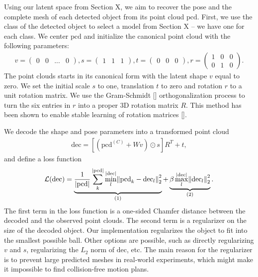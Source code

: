 \documentclass{article}
\newcommand{\pcx}[1]{\mathrm{pcd}^{(#1)}}
\newcommand{\pcc}{\pcx{C}}
\begin{document}
Using our latent space from Section X, we aim to recover the pose and the complete mesh of each detected object from its point cloud $\mathrm{pcd}$. First, we use the class of the detected object to select a model from Section X -- we have one for each class. We center $\mathrm{pcd}$ and initialize the canonical point cloud with the following parameters:
\begin{align}
    v = \begin{pmatrix} 0 & 0 & ... & 0 \end{pmatrix}, s = \begin{pmatrix} 1 & 1 & 1 \end{pmatrix}, t = \begin{pmatrix} 0 & 0 & 0 \end{pmatrix}, r = \begin{pmatrix} 1 & 0 & 0 \\ 0 & 1 & 0 \end{pmatrix}.
\end{align}
The point clouds starts in its canonical form with the latent shape $v$ equal to zero. We set the initial scale $s$ to one, translation $t$ to zero and rotation $r$ to a unit rotation matrix. We use the Gram-Schmidt [] orthogonalization process to turn the six entries in $r$ into a proper 3D rotation matrix $R$. This method has been shown to enable stable learning of rotation matrices [].

We decode the shape and pose parameters into a transformed point cloud
\begin{align}
    \mathrm{dec} = [(\pcc + W v) \odot s] R^T + t,
\end{align}
and define a loss function
\begin{align}
    \mathcal{L}(\mathrm{dec}) = \underbrace{\frac{1}{|\mathrm{pcd}|} \sum_k^{|\mathrm{pcd}|} \min_l^{|\mathrm{dec}|} \norm{\mathrm{pcd}_k - \mathrm{dec}_l}_2^2}_{\text{(1)}} + \underbrace{\beta \max_l^{|\mathrm{dec}|} \norm{\mathrm{dec}_l}_2^2}_{\text{(2)}}.
\end{align}
The first term in the loss function is a one-sided Chamfer distance between the decoded and the observed point clouds. The second term is a regularizer on the size of the decoded object. Our implementation regularizes the object to fit into the smallest possible ball. Other options are possible, such as directly regularizing $v$ and $s$, regularizing the $L_2$ norm of $\mathrm{dec}$, etc. The main reason for the regularizer is to prevent large predicted meshes in real-world experiments, which might make it impossible to find collision-free motion plans.
\end{document}
